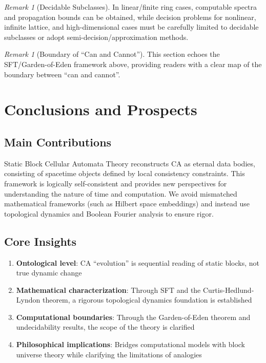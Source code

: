 \documentclass[11pt]{article}
\theoremstyle{definition}
\theoremstyle{remark}
\newtheorem{remark}[theorem]{Remark}
\begin{document}
\begin{remark}[Decidable Subclasses]
In linear/finite ring cases, computable spectra and propagation bounds can be obtained, while decision problems for nonlinear, infinite lattice, and high-dimensional cases must be carefully limited to decidable subclasses or adopt semi-decision/approximation methods.
\end{remark}

\begin{remark}[Boundary of ``Can and Cannot'']
This section echoes the SFT/Garden-of-Eden framework above, providing readers with a clear map of the boundary between ``can and cannot''.
\end{remark}

\section{Conclusions and Prospects}\label{sec:conclusions}

\subsection{Main Contributions}

Static Block Cellular Automata Theory reconstructs CA as eternal data bodies, consisting of spacetime objects defined by local consistency constraints. This framework is logically self-consistent and provides new perspectives for understanding the nature of time and computation. We avoid mismatched mathematical frameworks (such as Hilbert space embeddings) and instead use topological dynamics and Boolean Fourier analysis to ensure rigor.

\subsection{Core Insights}

\begin{enumerate}
\item \textbf{Ontological level}: CA ``evolution'' is sequential reading of static blocks, not true dynamic change
\item \textbf{Mathematical characterization}: Through SFT and the Curtis-Hedlund-Lyndon theorem, a rigorous topological dynamics foundation is established
\item \textbf{Computational boundaries}: Through the Garden-of-Eden theorem and undecidability results, the scope of the theory is clarified
\item \textbf{Philosophical implications}: Bridges computational models with block universe theory while clarifying the limitations of analogies
\end{enumerate}
\end{document}
